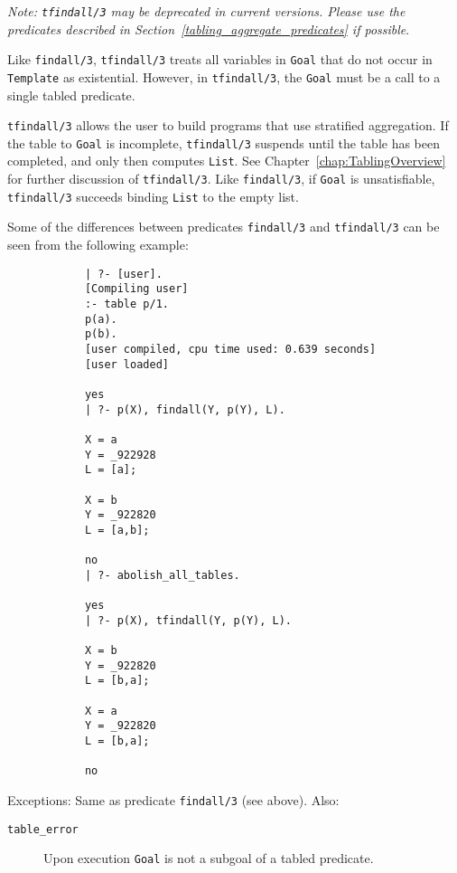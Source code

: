 \begin{description}
\label{tfindall/3}

    {\em Note: {\tt tfindall/3} may be deprecated in current versions.
    Please use the predicates described in
    Section~\ref{tabling_aggregate_predicates} if possible}.

    Like {\tt findall/3}, {\tt tfindall/3} treats all variables in
    {\tt Goal} that do not occur in {\tt Template} as existential.  However,
    in {\tt tfindall/3}, the {\tt Goal} must be a call to a single
    tabled predicate.
	
    {\tt tfindall/3} allows the user to build programs that use
    stratified aggregation.  If the table to {\tt Goal} is incomplete,
    {\tt tfindall/3} suspends until the table has been completed, and
    only then computes {\tt List}.  See Chapter~\ref{chap:TablingOverview}
    for further discussion of {\tt tfindall/3}.  Like {\tt findall/3},
    if {\tt Goal} is unsatisfiable, {\tt tfindall/3} succeeds binding
    {\tt List} to the empty list.

    Some of the differences between predicates {\tt findall/3} and
    {\tt tfindall/3} can be seen from the following example:

    {\footnotesize
    \begin{verbatim}
            | ?- [user].
            [Compiling user]
            :- table p/1.
            p(a).
            p(b).
            [user compiled, cpu time used: 0.639 seconds]
            [user loaded]

            yes
            | ?- p(X), findall(Y, p(Y), L).

            X = a
            Y = _922928
            L = [a];

            X = b
            Y = _922820
            L = [a,b];

            no
            | ?- abolish_all_tables.

            yes
            | ?- p(X), tfindall(Y, p(Y), L).

            X = b
            Y = _922820
            L = [b,a];

            X = a
            Y = _922820
            L = [b,a];

            no
    \end{verbatim}
    }

    Exceptions: Same as predicate {\tt findall/3} (see above).  Also:
    \begin{description}
    \item[{\tt table\_error}]
	Upon execution {\tt Goal} is not a subgoal of a tabled predicate.
    \end{description}


\end{description}
